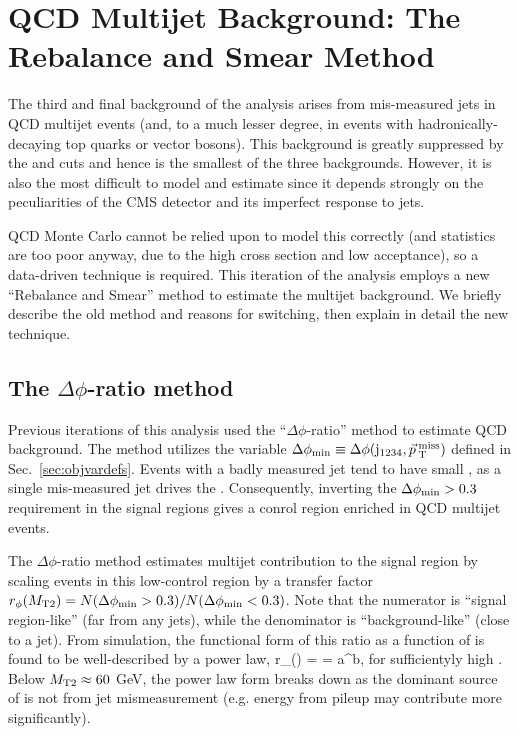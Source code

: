 \chapter{QCD Multijet Background: The Rebalance and Smear Method}

The third and final background of the \mttwo analysis arises from mis-measured
jets in QCD multijet events (and, to a much lesser degree, in events with 
hadronically-decaying top quarks or vector bosons). 
This background is greatly suppressed by the
\mttwo and \dphimet cuts and hence is the smallest of the three backgrounds. 
However, it is also the most difficult to model and estimate since it depends
strongly on the peculiarities of the CMS detector and its imperfect response to jets.

QCD Monte Carlo cannot be relied upon to model this correctly (and statistics are too poor
anyway, due to the high cross section and low acceptance), so a data-driven technique is required.
This iteration of the analysis employs a new ``Rebalance and Smear'' method 
to estimate the multijet background. We briefly describe the old method and reasons 
for switching, then explain in detail the new technique.

\section{The $\Delta\phi$-ratio method}

Previous iterations of this analysis \cite{CMS:mt22016,CMS:mt22015} 
used the ``$\Delta\phi$-ratio'' method to estimate QCD background.
The method utilizes the variable $\Delta\phi_{\mathrm{min}} \equiv \Delta\phi(\mathrm{j}_{1234},\vec{p}_{\> \mathrm{T}}^{\> \mathrm{miss}})$ defined in
Sec.~\ref{sec:objvardefs}. Events with a badly measured jet tend to have
small \dpmin, as a single mis-measured jet drives the \vMet. Consequently,
inverting the $\Delta\phi_{\mathrm{min}}>0.3$ requirement in the signal regions gives a 
conrol region enriched in QCD multijet events.

The $\Delta\phi$-ratio method estimates multijet contribution to the 
signal region by scaling events in this low-\dpmin control region
by a transfer factor $r_\phi(M_{\mathrm{T2}}) = N(\Delta\phi_{\mathrm{min}} > 0.3) / N(\Delta\phi_{\mathrm{min}} < 0.3)$.
Note that the numerator is ``signal region-like'' (\vMet far from any jets),
while the denominator is ``background-like'' (\vMet close to a jet).
From simulation, the functional form of this ratio as a function of \mttwo
is found to be well-described by a power law,
\be
r_\phi(\mttwo) =  = a\cdot\mttwo^b,
\ee
for sufficientyly high \mttwo. Below $M_{\mathrm{T2}}\approx60$ GeV, the power law
form breaks down as the dominant source of \vMet is not from jet mismeasurement
(e.g. energy from pileup may contribute more significantly).

